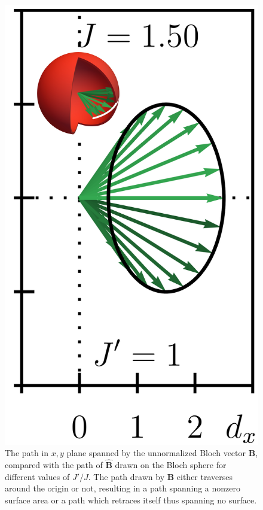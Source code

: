 \begin{figure}[ht]
    \includegraphics{figures/ssh_unnormalized_winding_6.png}
    \caption{The path in $x,y$ plane spanned by the unnormalized Bloch vector $\bm B$, compared with the path of $\hat{\bm B}$ drawn on the Bloch sphere for different values of $J'/J$. The path drawn by $\bm B$ either traverses around the origin or not, resulting in a path spanning a nonzero surface area or a path which retraces itself thus spanning no surface.}
    \label{fig:ssh_winding_easy}
\end{figure}

